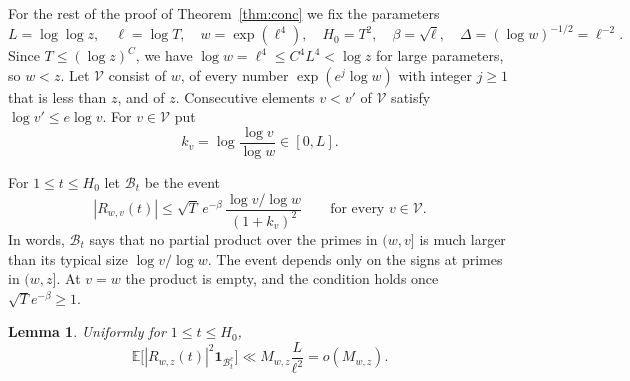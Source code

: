 \documentclass[11pt]{amsart}
\newtheorem{lemma}[theorem]{Lemma}
\theoremstyle{remark}
\numberwithin{equation}{section}
\newcommand{\E}{\mathbb{E}}
\newcommand{\one}{\mathbf{1}}
\begin{document}
For the rest of the proof of Theorem~\ref{thm:conc} we fix the parameters
\[
L=\log\log z,\quad\ell=\log T,\quad w=\exp(\ell^4),\quad H_0=T^2,\quad\beta=\sqrt\ell,\quad\Delta=(\log w)^{-1/2}=\ell^{-2}.
\]
Since $T\le(\log z)^C$, we have $\log w=\ell^4\le C^4L^4<\log z$ for large parameters, so $w<z$. Let $\mathcal V$ consist of $w$, of every number $\exp(e^j\log w)$ with integer $j\ge1$ that is less than $z$, and of $z$. Consecutive elements $v<v'$ of $\mathcal V$ satisfy $\log v'\le e\log v$. For $v\in\mathcal V$ put
\[
k_v=\log\frac{\log v}{\log w}\in[0,L].
\]

For $1\le t\le H_0$ let $\mathcal B_t$ be the event
\begin{equation}\label{eq:barrier}
|R_{w,v}(t)|\le\sqrt T\,e^{-\beta}\,\frac{\log v/\log w}{(1+k_v)^2}\qquad\text{for every }v\in\mathcal V .
\end{equation}
In words, $\mathcal B_t$ says that no partial product over the primes in $(w,v]$ is much larger than its typical size $\log v/\log w$. The event depends only on the signs at primes in $(w,z]$. At $v=w$ the product is empty, and the condition holds once $\sqrt Te^{-\beta}\ge1$.

\begin{lemma}\label{lem:barrier}
Uniformly for $1\le t\le H_0$,
\begin{equation}\label{eq:barrierbound}
\E\bigl[|R_{w,z}(t)|^2\one_{\mathcal B_t^c}\bigr]\ll M_{w,z}\frac{L}{\ell^2}=o(M_{w,z}).
\end{equation}
\end{lemma}
\end{document}
